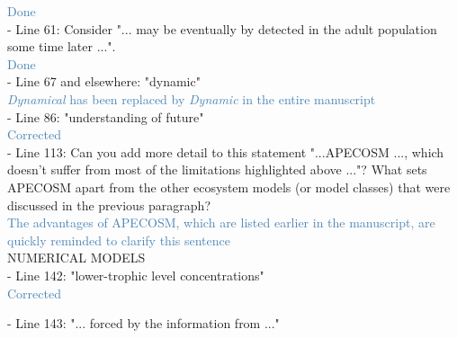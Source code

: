 \documentclass[12pt]{article}
\newcommand{\resp}[1]{\textcolor{SteelBlue}{#1}}
\begin{document}
\resp{Done}\\

- Line 61: Consider "... may be eventually by detected in the adult population some time later ...".\\

\resp{Done}   \\

- Line 67 and elsewhere: "dynamic"\\

\resp{\emph{Dynamical} has been replaced by \emph{Dynamic} in the entire manuscript} \\

- Line 86: "understanding of future" \\

\resp{Corrected} \\

- Line 113: Can you add more detail to this statement "...APECOSM ..., which doesn't suffer from most of the limitations highlighted above ..."? What sets APECOSM apart from the other ecosystem models (or model classes) that were discussed in the previous paragraph?\\

\resp{The advantages of APECOSM, which are listed earlier in the manuscript, are quickly reminded to clarify this sentence}\\

NUMERICAL MODELS\\

- Line 142: "lower-trophic level concentrations"\\

\resp{Corrected}

- Line 143: "... forced by the information from ..."\\
\end{document}
